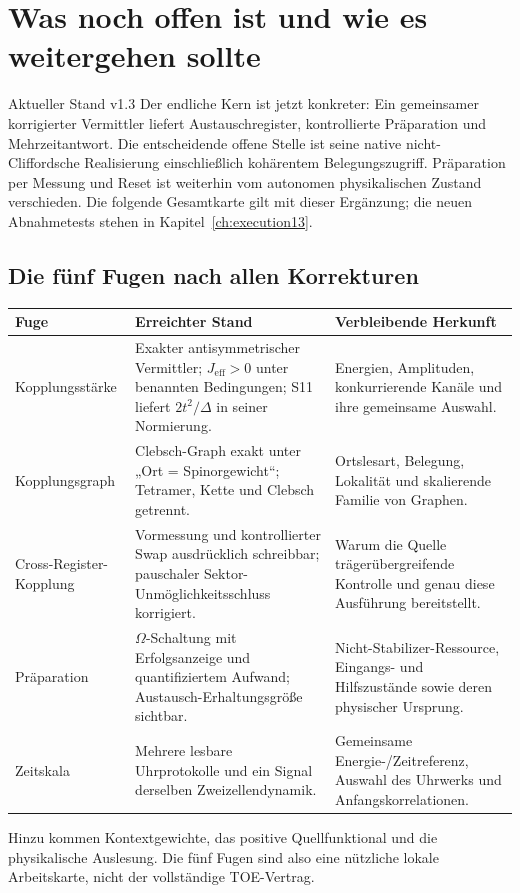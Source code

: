 \chapter{Was noch offen ist und wie es weitergehen sollte}
\label{ch:offen}
\begin{bild}{Aktueller Stand v1.3}
Der endliche Kern ist jetzt konkreter: Ein gemeinsamer korrigierter Vermittler liefert Austauschregister, kontrollierte Präparation und Mehrzeitantwort. Die entscheidende offene Stelle ist seine native nicht-Cliffordsche Realisierung einschließlich kohärentem Belegungszugriff. Präparation per Messung und Reset ist weiterhin vom autonomen physikalischen Zustand verschieden. Die folgende Gesamtkarte gilt mit dieser Ergänzung; die neuen Abnahmetests stehen in Kapitel~\ref{ch:execution13}.
\end{bild}
\section{Die fünf Fugen nach allen Korrekturen}
\begin{longtable}{L{31mm}L{62mm}L{57mm}}
\toprule \textbf{Fuge}&\textbf{Erreichter Stand}&\textbf{Verbleibende Herkunft}\\\midrule\endhead
Kopplungsstärke&Exakter antisymmetrischer Vermittler; $J_{\mathrm{eff}}>0$ unter benannten Bedingungen; S11 liefert $2t^2/\Delta$ in seiner Normierung.&Energien, Amplituden, konkurrierende Kanäle und ihre gemeinsame Auswahl.\\
Kopplungsgraph&Clebsch-Graph exakt unter „Ort = Spinorgewicht“; Tetramer, Kette und Clebsch getrennt.&Ortslesart, Belegung, Lokalität und skalierende Familie von Graphen.\\
Cross-Register-Kopplung&Vormessung und kontrollierter Swap ausdrücklich schreibbar; pauschaler Sektor-Unmöglichkeitsschluss korrigiert.&Warum die Quelle trägerübergreifende Kontrolle und genau diese Ausführung bereitstellt.\\
Präparation&$\Omega$-Schaltung mit Erfolgsanzeige und quantifiziertem Aufwand; Austausch-Erhaltungsgröße sichtbar.&Nicht-Stabilizer-Ressource, Eingangs- und Hilfszustände sowie deren physischer Ursprung.\\
Zeitskala&Mehrere lesbare Uhrprotokolle und ein Signal derselben Zweizellendynamik.&Gemeinsame Energie-/Zeitreferenz, Auswahl des Uhrwerks und Anfangskorrelationen.\\\bottomrule
\end{longtable}
Hinzu kommen Kontextgewichte, das positive Quellfunktional und die physikalische Auslesung. Die fünf Fugen sind also eine nützliche lokale Arbeitskarte, nicht der vollständige TOE-Vertrag.

